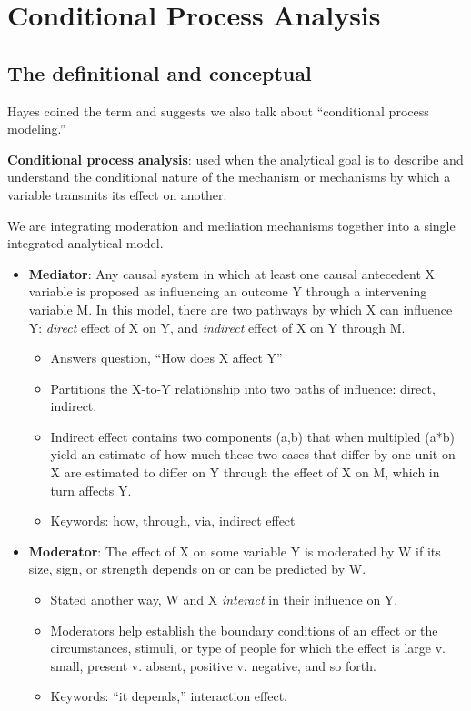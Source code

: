\documentclass[
]{book}
\providecommand{\tightlist}{%
  \setlength{\itemsep}{0pt}\setlength{\parskip}{0pt}}
\begin{document}
\hypertarget{conditional-process-analysis}{%
\section{Conditional Process Analysis}\label{conditional-process-analysis}}

\hypertarget{the-definitional-and-conceptual-1}{%
\subsection{The definitional and conceptual}\label{the-definitional-and-conceptual-1}}

Hayes \citeyearpar{hayes_introduction_2018} coined the term and suggests we also talk about ``conditional process modeling.''

\textbf{Conditional process analysis}: used when the analytical goal is to describe and understand the conditional nature of the mechanism or mechanisms by which a variable transmits its effect on another.

We are integrating moderation and mediation mechanisms together into a single integrated analytical model.

\begin{itemize}
\tightlist
\item
  \textbf{Mediator}: Any causal system in which at least one causal antecedent X variable is proposed as influencing an outcome Y through a intervening variable M. In this model, there are two pathways by which X can influence Y: \emph{direct} effect of X on Y, and \emph{indirect} effect of X on Y through M.

  \begin{itemize}
  \tightlist
  \item
    Answers question, ``How does X affect Y''
  \item
    Partitions the X-to-Y relationship into two paths of influence: direct, indirect.
  \item
    Indirect effect contains two components (a,b) that when multipled (a*b) yield an estimate of how much these two cases that differ by one unit on X are estimated to differ on Y through the effect of X on M, which in turn affects Y.
  \item
    Keywords: how, through, via, indirect effect
  \end{itemize}
\item
  \textbf{Moderator}: The effect of X on some variable Y is moderated by W if its size, sign, or strength depends on or can be predicted by W.

  \begin{itemize}
  \tightlist
  \item
    Stated another way, W and X \emph{interact} in their influence on Y.\\
  \item
    Moderators help establish the boundary conditions of an effect or the circumstances, stimuli, or type of people for which the effect is large v. small, present v. absent, positive v. negative, and so forth.
  \item
    Keywords: ``it depends,'' interaction effect.
  \end{itemize}
\end{itemize}
\end{document}
